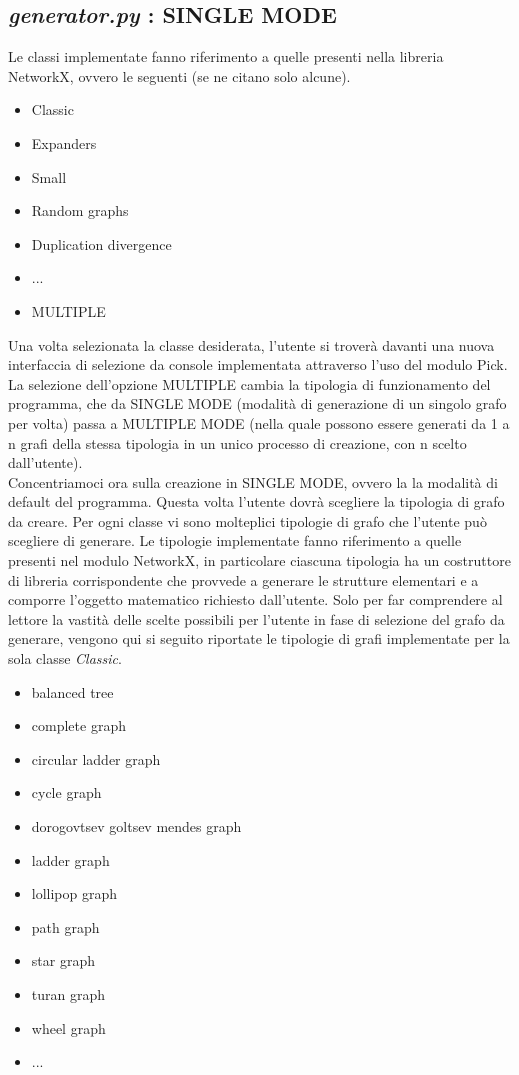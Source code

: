 \subsection{\textit{generator.py} : SINGLE MODE}
\justify
Le classi implementate fanno riferimento a quelle presenti nella libreria NetworkX, ovvero le seguenti (se ne citano solo alcune).

\begin{itemize}
	\item Classic
	\item Expanders
	\item Small 
	\item Random graphs 
	\item Duplication divergence 
	\item ...
	\item MULTIPLE
\end{itemize}

Una volta selezionata la classe desiderata, l'utente si troverà davanti una nuova interfaccia di selezione da console implementata attraverso l'uso del modulo Pick. La selezione dell'opzione MULTIPLE cambia la tipologia di funzionamento del programma, che da SINGLE MODE (modalità di generazione di un singolo grafo per volta) passa a MULTIPLE MODE (nella quale possono essere generati da 1 a n grafi della stessa tipologia in un unico processo di creazione, con n scelto dall'utente).\\
Concentriamoci ora sulla creazione in SINGLE MODE, ovvero la la modalità di default del programma. Questa volta l'utente dovrà scegliere la tipologia di grafo da creare. Per ogni classe vi sono molteplici tipologie di grafo che l'utente può scegliere di generare. Le tipologie implementate fanno riferimento a quelle presenti nel modulo NetworkX, in particolare ciascuna tipologia ha un costruttore di libreria corrispondente che provvede a generare le strutture elementari e a comporre l'oggetto matematico richiesto dall'utente. Solo per far comprendere al lettore la vastità delle scelte possibili per l'utente in fase di selezione del grafo da generare, vengono qui si seguito riportate le tipologie di grafi implementate per la sola classe \textit{Classic}.

\begin{itemize}
	\item balanced tree
	\item complete graph
	\item circular ladder graph
	\item cycle graph
	\item dorogovtsev goltsev mendes graph
	\item ladder graph
	\item lollipop graph
	\item path graph
	\item star graph
	\item turan graph
	\item wheel graph
	\item ...
\end{itemize}

